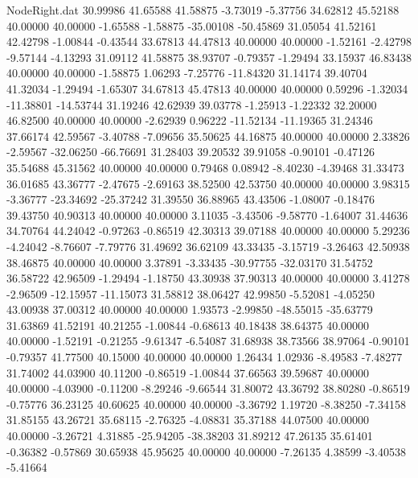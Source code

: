 \begin{filecontents}{NodeRight.dat}
  30.99986   41.65588   41.58875    -3.73019   -5.37756   34.62812   45.52188   40.00000   40.00000   -1.65588   -1.58875  -35.00108  -50.45869
  31.05054   41.52161   42.42798    -1.00844   -0.43544   33.67813   44.47813   40.00000   40.00000   -1.52161   -2.42798   -9.57144   -4.13293
  31.09112   41.58875   38.93707    -0.79357   -1.29494   33.15937   46.83438   40.00000   40.00000   -1.58875    1.06293   -7.25776  -11.84320
  31.14174   39.40704   41.32034    -1.29494   -1.65307   34.67813   45.47813   40.00000   40.00000    0.59296   -1.32034  -11.38801  -14.53744
  31.19246   42.62939   39.03778    -1.25913   -1.22332   32.20000   46.82500   40.00000   40.00000   -2.62939    0.96222  -11.52134  -11.19365
  31.24346   37.66174   42.59567    -3.40788   -7.09656   35.50625   44.16875   40.00000   40.00000    2.33826   -2.59567  -32.06250  -66.76691
  31.28403   39.20532   39.91058    -0.90101   -0.47126   35.54688   45.31562   40.00000   40.00000    0.79468    0.08942   -8.40230   -4.39468
  31.33473   36.01685   43.36777    -2.47675   -2.69163   38.52500   42.53750   40.00000   40.00000    3.98315   -3.36777  -23.34692  -25.37242
  31.39550   36.88965   43.43506    -1.08007   -0.18476   39.43750   40.90313   40.00000   40.00000    3.11035   -3.43506   -9.58770   -1.64007
  31.44636   34.70764   44.24042    -0.97263   -0.86519   42.30313   39.07188   40.00000   40.00000    5.29236   -4.24042   -8.76607   -7.79776
  31.49692   36.62109   43.33435    -3.15719   -3.26463   42.50938   38.46875   40.00000   40.00000    3.37891   -3.33435  -30.97755  -32.03170
  31.54752   36.58722   42.96509    -1.29494   -1.18750   43.30938   37.90313   40.00000   40.00000    3.41278   -2.96509  -12.15957  -11.15073
  31.58812   38.06427   42.99850    -5.52081   -4.05250   43.00938   37.00312   40.00000   40.00000    1.93573   -2.99850  -48.55015  -35.63779
  31.63869   41.52191   40.21255    -1.00844   -0.68613   40.18438   38.64375   40.00000   40.00000   -1.52191   -0.21255   -9.61347   -6.54087
  31.68938   38.73566   38.97064    -0.90101   -0.79357   41.77500   40.15000   40.00000   40.00000    1.26434    1.02936   -8.49583   -7.48277
  31.74002   44.03900   40.11200    -0.86519   -1.00844   37.66563   39.59687   40.00000   40.00000   -4.03900   -0.11200   -8.29246   -9.66544
  31.80072   43.36792   38.80280    -0.86519   -0.75776   36.23125   40.60625   40.00000   40.00000   -3.36792    1.19720   -8.38250   -7.34158
  31.85155   43.26721   35.68115    -2.76325   -4.08831   35.37188   44.07500   40.00000   40.00000   -3.26721    4.31885  -25.94205  -38.38203
  31.89212   47.26135   35.61401    -0.36382   -0.57869   30.65938   45.95625   40.00000   40.00000   -7.26135    4.38599   -3.40538   -5.41664

\end{filecontents}
